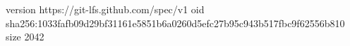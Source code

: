 version https://git-lfs.github.com/spec/v1
oid sha256:1033fafb09d29bf31161e5851b6a0260d5efc27b95c943b517fbc9f62556b810
size 2042
